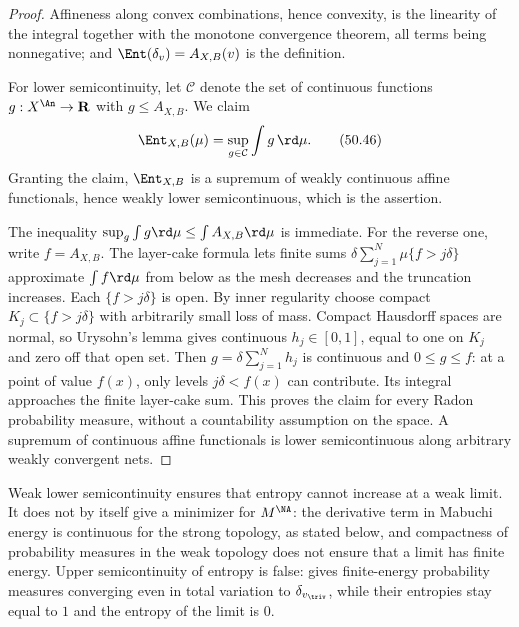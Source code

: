 \begin{proof}
Affineness along convex combinations, hence convexity, is the linearity of
the integral together with the monotone convergence theorem, all terms
being nonnegative; and $\Ent(\delta_v)=A_{X,B}(v)$ is the definition.

For lower semicontinuity, let $\mathcal C$ denote the set of continuous
functions $g:X^{\An}\to\mathbf R$ with $g\le A_{X,B}$.  We claim
\[
 \Ent_{X,B}(\mu)=\sup_{g\in\mathcal C}\int g\,\rd\mu .
\tag{50.46}\label{eq:ch50-entropy-sup-continuous}
\]
Granting the claim, $\Ent_{X,B}$ is a supremum of weakly continuous
affine functionals, hence weakly lower semicontinuous, which is the
assertion.

The inequality $\sup_g\int g\rd\mu\le\int A_{X,B}\rd\mu$ is immediate.
For the reverse one, write $f=A_{X,B}$.  The layer-cake formula lets
finite sums $\delta\sum_{j=1}^N\mu\{f>j\delta\}$ approximate
$\int f\rd\mu$ from below as the mesh decreases and the truncation
increases.  Each $\{f>j\delta\}$ is open.  By inner regularity choose
compact $K_j\subset\{f>j\delta\}$ with arbitrarily small loss of mass.
Compact Hausdorff spaces are normal, so Urysohn's lemma gives continuous
$h_j\in[0,1]$, equal to one on $K_j$ and zero off that open set.
Then $g=\delta\sum_{j=1}^Nh_j$ is continuous and $0\le g\le f$:
at a point of value $f(x)$, only levels $j\delta<f(x)$ can contribute.
Its integral approaches the finite layer-cake sum.  This proves the
claim for every Radon probability measure, without a countability
assumption on the space.  A supremum of continuous affine functionals
is lower semicontinuous along arbitrary weakly convergent nets.
\end{proof}

\begin{remark}
\label{rem:ch50-entropy-lsc-direction}
Weak lower semicontinuity ensures that entropy cannot increase at a
weak limit.  It does not by itself give a minimizer for $M^{\NA}$:
the derivative term in Mabuchi energy is continuous for the strong
topology, as stated below, and compactness of probability measures in the
weak topology does not ensure that a limit has finite energy.
Upper semicontinuity of entropy is false:
 gives finite-energy probability measures
converging even in total variation to $\delta_{v_{\triv}}$, while their
entropies stay equal to $1$ and the entropy of the limit is $0$.
\end{remark}


